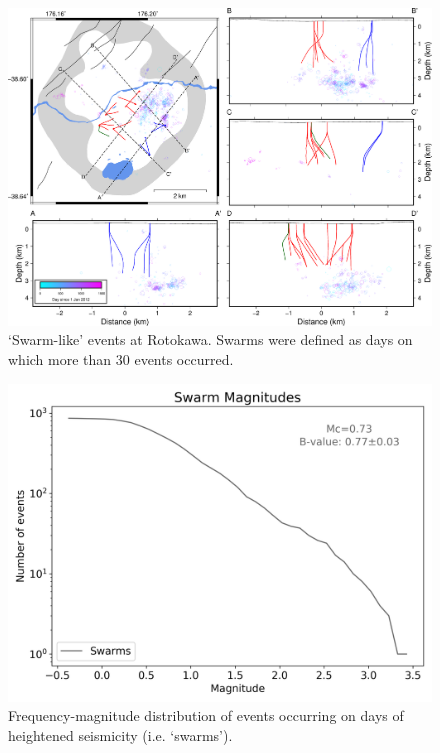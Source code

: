 \begin{figure}[h!]
\begin{center}
\includegraphics[width=0.98\columnwidth]{Chapter_4_Rot/figures/merc_Rot_dets_GC_swarms_30/merc_Rot_dets_GC_swarms_30}
\caption[Rotokawa `swarm' locations]{{
`Swarm-like' events at Rotokawa. Swarms were defined as days on which
more than 30 events occurred.
{\label{117000}}%
}}
\end{center}
\end{figure}


\begin{figure}[h!]
\begin{center}
\includegraphics[width=0.70\columnwidth]{Chapter_4_Rot/figures/Rot_swarms_thresh_30/Rot_swarms_thresh_30}
\caption[`Swarm' frequency-magnitude distribution]{{
Frequency-magnitude distribution of events occurring on days of
heightened seismicity (i.e. `swarms').
{\label{322180}}%
}}
\end{center}
\end{figure}
